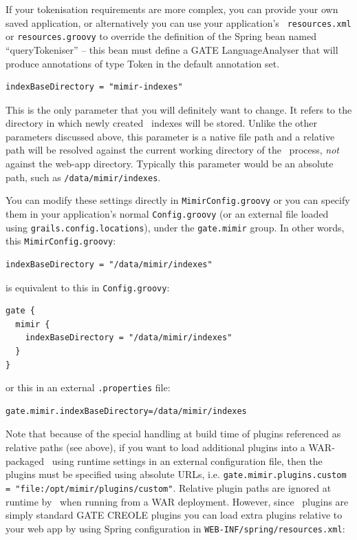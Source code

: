 If your tokenisation requirements are more complex, you can provide your own
saved application, or alternatively you can use your application's {\tt
resources.xml} or {\tt resources.groovy} to override the definition of the
Spring bean named ``queryTokeniser'' -- this bean must define a GATE
LanguageAnalyser that will produce annotations of type Token in the default
annotation set.

\begin{lstlisting}
indexBaseDirectory = "mimir-indexes"
\end{lstlisting}

This is the only parameter that you will definitely want to change.  It refers
to the directory in which newly created \Mimir\ indexes will be stored.  Unlike
the other parameters discussed above, this parameter is a native file path and
a relative path will be resolved against the current working directory of the
\Mimir\ process, {\em not} against the web-app directory.  Typically this
parameter would be an absolute path, such as \verb|/data/mimir/indexes|.

You can modify these settings directly in {\tt MimirConfig.groovy} or you can
specify them in your application's normal {\tt Config.groovy} (or an external
file loaded using {\tt grails.config.locations}), under the {\tt gate.mimir}
group.  In other words, this {\tt MimirConfig.groovy}:
\begin{lstlisting}
indexBaseDirectory = "/data/mimir/indexes"
\end{lstlisting}
%
is equivalent to this in {\tt Config.groovy}:
\begin{lstlisting}
gate {
  mimir {
    indexBaseDirectory = "/data/mimir/indexes"
  }
}
\end{lstlisting}
%
or this in an external {\tt .properties} file:
\begin{lstlisting}
gate.mimir.indexBaseDirectory=/data/mimir/indexes
\end{lstlisting}

Note that because of the special handling at build time of plugins referenced
as relative paths (see above), if you want to load additional plugins into a
WAR-packaged \Mimir\ using runtime settings in an external configuration file,
then the plugins must be specified using absolute URLs, i.e.
{\tt gate.mimir.plugins.custom = "file:/opt/mimir/plugins/custom"}.  Relative
plugin paths are ignored at runtime by \Mimir\ when running from a WAR
deployment.  However, since \Mimir\ plugins are simply standard GATE CREOLE
plugins you can load extra plugins relative to your web app by using Spring
configuration in {\tt WEB-INF/spring/resources.xml}:

